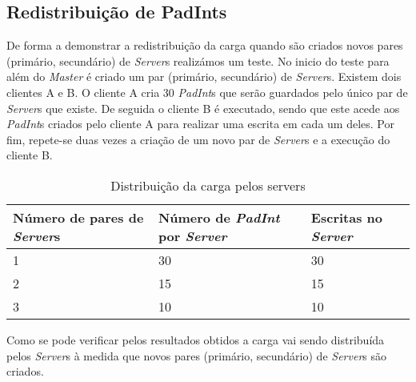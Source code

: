 \subsection{Redistribuição de PadInts}

De forma a demonstrar a redistribuição da carga quando são criados novos pares (primário, secundário) de \textit{Server}s realizámos um teste. No inicio do teste para além do \textit{Master} é criado um par (primário, secundário) de \textit{Server}s. Existem dois clientes A e B. O cliente A cria 30 \textit{PadInt}s que serão guardados pelo único par de \textit{Server}s que existe. De seguida o cliente B é executado, sendo que este acede aos \textit{PadInt}s criados pelo cliente A para realizar uma escrita em cada um deles. Por fim, repete-se duas vezes a criação de um novo par de \textit{Server}s e a execução do cliente B.
\begin{table}[H]
\centering
\begin{tabular}{| p{2.2cm} | p{2.2cm} | p{2.2cm} |}
\hline
\textbf{Número de pares de \textit{Server}s} &\textbf{Número de \textit{PadInt} por \textit{Server}} & \textbf{Escritas no \textit{Server}} \\
\hline
1 & 30 & 30  \\
\hline
2 & 15 & 15  \\
\hline
3 & 10 & 10 \\
\hline
\end{tabular}
\caption{Distribuição da carga pelos servers} \label{lib}
\end{table}

Como se pode verificar pelos resultados obtidos a carga vai sendo distribuída pelos \textit{Server}s à medida que novos pares (primário, secundário) de \textit{Server}s são criados.
